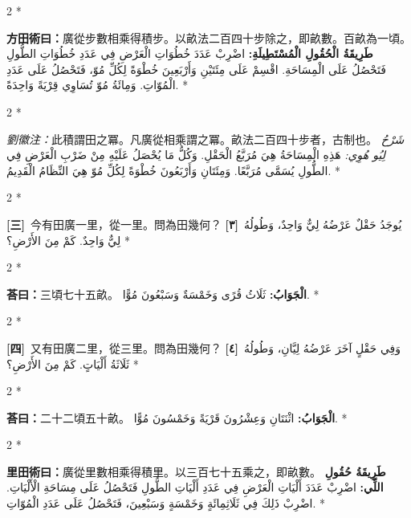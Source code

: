 \documentclass[11pt,a4paper]{article}
\newcommand{\ar}[1]{\arabicfont\beginR #1\endR}
\newcommand{\problemnum}[1]{\textbf{[\ignorespaces#1\unskip]}}
\newenvironment{bilingual}{%
  \begin{paracol}{2}%
  \switchcolumn[0]*%
}{%
  \end{paracol}%
}
\newcommand{\cnline}[1]{\switchcolumn[0]\noindent #1 \switchcolumn[1]}
\newcommand{\arline}[1]{\noindent\ar{#1} \switchcolumn[0]*}
\newenvironment{prob bilingual}{%
  \begin{paracol}{2}%
  \switchcolumn[0]*%
}{%
  \end{paracol}%
  \vspace{0.3em}%
}
\begin{document}
\begin{bilingual}
\cnline{%
\textcolor{methodcolor}{\textbf{方田術曰：}}廣從步數相乘得積步。以畝法二百四十步除之，即畝數。百畝為一頃。
}
\arline{%
\textcolor{methodcolor}{\textbf{طَرِيقَةُ الْحُقُولِ الْمُسْتَطِيلَةِ:}} اضْرِبْ عَدَدَ خُطُوَاتِ الْعَرْضِ فِي عَدَدِ خُطُوَاتِ الطُّولِ فَتَحْصُلُ عَلَى الْمِسَاحَةِ. اقْسِمْ عَلَى مِئَتَيْنِ وَأَرْبَعِينَ خُطْوَةً لِكُلِّ مُوّ، فَتَحْصُلُ عَلَى عَدَدِ الْمُوّاتِ. وَمِائَةُ مُوّ تُسَاوِي قِرْيَةً وَاحِدَةً.
}
\end{bilingual}

\begin{bilingual}
\cnline{%
\textcolor{commentarycolor}{\small\textit{劉徽注：}}此積謂田之冪。凡廣從相乘謂之冪。畝法二百四十步者，古制也。
}
\arline{%
\textcolor{commentarycolor}{\small\textit{شَرْحُ لِيُو هُوِي:}} هَذِهِ الْمِسَاحَةُ هِيَ مُرَبَّعُ الْحَقْلِ. وَكُلُّ مَا يُحْصَلُ عَلَيْهِ مِنْ ضَرْبِ الْعَرْضِ فِي الطُّولِ يُسَمَّى مُرَبَّعًا. وَمِئَتَانِ وَأَرْبَعُونَ خُطْوَةً لِكُلِّ مُوّ هِيَ النِّظَامُ الْقَدِيمُ.
}
\end{bilingual}

\begin{bilingual}
\cnline{\problemnum{三}\, 今有田廣一里，從一里。問為田幾何？}
\arline{\problemnum{٣}\, يُوجَدُ حَقْلٌ عَرْضُهُ لِيٌّ وَاحِدٌ، وَطُولُهُ لِيٌّ وَاحِدٌ. كَمْ مِنَ الأَرْضِ؟}
\end{bilingual}

\begin{bilingual}
\cnline{\textcolor{answercolor}{\textbf{荅曰：}}三頃七十五畝。}
\arline{\textcolor{answercolor}{\textbf{الْجَوَابُ:}} ثَلَاثُ قُرًى وَخَمْسَةٌ وَسَبْعُونَ مُوًّا.}
\end{bilingual}

\begin{bilingual}
\cnline{\problemnum{四}\, 又有田廣二里，從三里。問為田幾何？}
\arline{\problemnum{٤}\, وَفِي حَقْلٍ آخَرَ عَرْضُهُ لِيَّانِ، وَطُولُهُ ثَلَاثَةُ أَلْيَاتٍ. كَمْ مِنَ الأَرْضِ؟}
\end{bilingual}

\begin{bilingual}
\cnline{\textcolor{answercolor}{\textbf{荅曰：}}二十二頃五十畝。}
\arline{\textcolor{answercolor}{\textbf{الْجَوَابُ:}} اثْنَتَانِ وَعِشْرُونَ قَرْيَةً وَخَمْسُونَ مُوًّا.}
\end{bilingual}

\begin{bilingual}
\cnline{%
\textcolor{methodcolor}{\textbf{里田術曰：}}廣從里數相乘得積里。以三百七十五乘之，即畝數。
}
\arline{%
\textcolor{methodcolor}{\textbf{طَرِيقَةُ حُقُولِ اللِّي:}} اضْرِبْ عَدَدَ أَلْيَاتِ الْعَرْضِ فِي عَدَدِ أَلْيَاتِ الطُّولِ فَتَحْصُلُ عَلَى مِسَاحَةِ الْأَلْيَاتِ. اضْرِبْ ذَلِكَ فِي ثَلَاثِمِائَةٍ وَخَمْسَةٍ وَسَبْعِينَ، فَتَحْصُلُ عَلَى عَدَدِ الْمُوّاتِ.
}
\end{bilingual}
\end{document}
